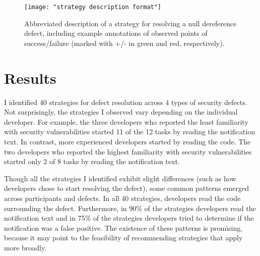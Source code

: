 \documentclass{sig-alternate}
\begin{document}
\begin{figure}
	\centering
	\texttt{[image: "strategy description format"]}
	\caption{Abbreviated description of a strategy for resolving a null dereference defect, including example annotations of observed points of success/failure (marked with +/- in green and red, respectively). }
	\label{fig:description} 

\end{figure}




%



\section{Results}
I identified 40 strategies for defect resolution across 4 types of security defects. 
Not surprisingly, the strategies I observed vary depending on the individual developer.
For example, the three developers who reported the least familiarity with security vulnerabilities started 11 of the 12 tasks by reading the notification text.
In contrast, more experienced developers started by reading the code.
The two developers who reported the highest familiarity with security vulnerabilities started only 2 of 8 tasks by reading the notification text. 

Though all the strategies I identified exhibit slight differences (such as how developers chose to start resolving the defect), some common patterns emerged across participants and defects. 
In all 40 strategies, developers read the code surrounding the defect. Furthermore, in 90\% of the strategies developers read the notification text and in 75\% of the strategies developers tried to determine if the notification was a false positive.
The existence of these patterns is promising, because it may point to the feasibility of recommending strategies that apply more broadly. 
\end{document}

